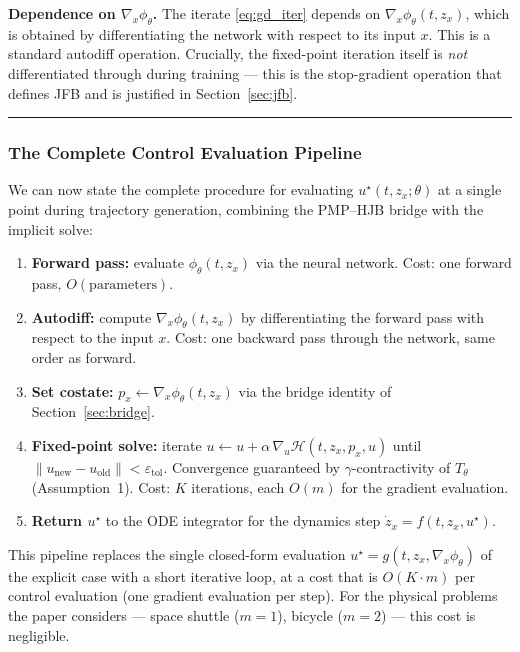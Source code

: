 \documentclass{article}
\begin{document}
\begin{compnumissuesbox}
\textbf{Dependence on $\nabla_x\phi_\theta$.} The iterate
\eqref{eq:gd_iter} depends on $\nabla_x\phi_\theta(t, z_x)$, which is obtained
by differentiating the network with respect to its input $x$. This is a standard
autodiff operation. Crucially, the fixed-point iteration itself is \textit{not}
differentiated through during training --- this is the stop-gradient operation
that defines JFB and is justified in Section~\ref{sec:jfb}.
\end{compnumissuesbox}

\medskip\hrule\medskip

\subsubsection{The Complete Control Evaluation Pipeline}

\begin{tldrbox}
We can now state the complete procedure for evaluating $u^\star(t, z_x;\theta)$
at a single point during trajectory generation, combining the PMP--HJB bridge
with the implicit solve:

\medskip

\begin{enumerate}
    \setlength{\itemsep}{0.6em}

    \item \textbf{Forward pass:} evaluate $\phi_\theta(t, z_x)$ via the neural
          network. Cost: one forward pass, $O(\text{parameters})$.

    \item \textbf{Autodiff:} compute $\nabla_x\phi_\theta(t, z_x)$ by
          differentiating the forward pass with respect to the input $x$.
          Cost: one backward pass through the network, same order as forward.

    \item \textbf{Set costate:} $p_x \leftarrow \nabla_x\phi_\theta(t, z_x)$
          via the bridge identity of Section~\ref{sec:bridge}.

    \item \textbf{Fixed-point solve:} iterate $u \leftarrow u + \alpha\,
          \nabla_u\mathcal{H}(t, z_x, p_x, u)$ until
          $\|u_{\text{new}} - u_{\text{old}}\| < \varepsilon_{\text{tol}}$.
          Convergence guaranteed by $\gamma$-contractivity of $T_\theta$
          (Assumption~1). Cost: $K$ iterations, each $O(m)$ for the
          gradient evaluation.

    \item \textbf{Return $u^\star$} to the ODE integrator for the dynamics step
          $\dot{z}_x = f(t, z_x, u^\star)$.
\end{enumerate}

\medskip

This pipeline replaces the single closed-form evaluation $u^\star =
g(t, z_x, \nabla_x\phi_\theta)$ of the explicit case with a short iterative
loop, at a cost that is $O(K \cdot m)$ per control evaluation (one gradient
evaluation per step). For the physical problems the paper considers --- space
shuttle ($m = 1$), bicycle ($m = 2$) --- this cost is negligible.
\end{tldrbox}
\end{document}
